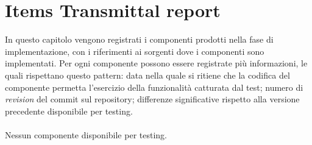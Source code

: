\chapter{Items Transmittal report}
\label{chap:transmittal_report}
In questo capitolo vengono registrati i componenti prodotti nella fase di
implementazione, con i riferimenti ai sorgenti dove i componenti sono
implementati. Per ogni componente possono essere registrate pi\`u informazioni,
le quali rispettano questo pattern: data nella quale si ritiene che la codifica del componente permetta l'esercizio della funzionalit\`a
catturata dal test; numero di \emph{revision} del commit sul repository;
differenze significative rispetto alla versione precedente disponibile per
testing.
\\ \\
Nessun componente disponibile per testing.

